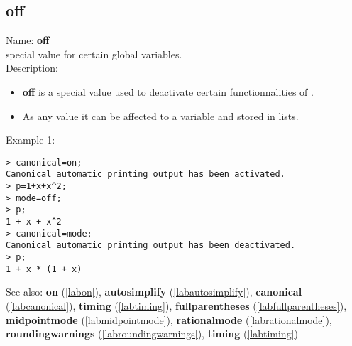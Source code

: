 \subsection{off}
\label{laboff}
\noindent Name: \textbf{off}\\
special value for certain global variables.\\
\noindent Description: \begin{itemize}

\item \textbf{off} is a special value used to deactivate certain functionnalities
   of \sollya.

\item As any value it can be affected to a variable and stored in lists.
\end{itemize}
\noindent Example 1: 
\begin{center}\begin{minipage}{15cm}\begin{Verbatim}[frame=single]
> canonical=on;
Canonical automatic printing output has been activated.
> p=1+x+x^2;
> mode=off;
> p;
1 + x + x^2
> canonical=mode;
Canonical automatic printing output has been deactivated.
> p;
1 + x * (1 + x)
\end{Verbatim}
\end{minipage}\end{center}
See also: \textbf{on} (\ref{labon}), \textbf{autosimplify} (\ref{labautosimplify}), \textbf{canonical} (\ref{labcanonical}), \textbf{timing} (\ref{labtiming}), \textbf{fullparentheses} (\ref{labfullparentheses}), \textbf{midpointmode} (\ref{labmidpointmode}), \textbf{rationalmode} (\ref{labrationalmode}), \textbf{roundingwarnings} (\ref{labroundingwarnings}), \textbf{timing} (\ref{labtiming})
